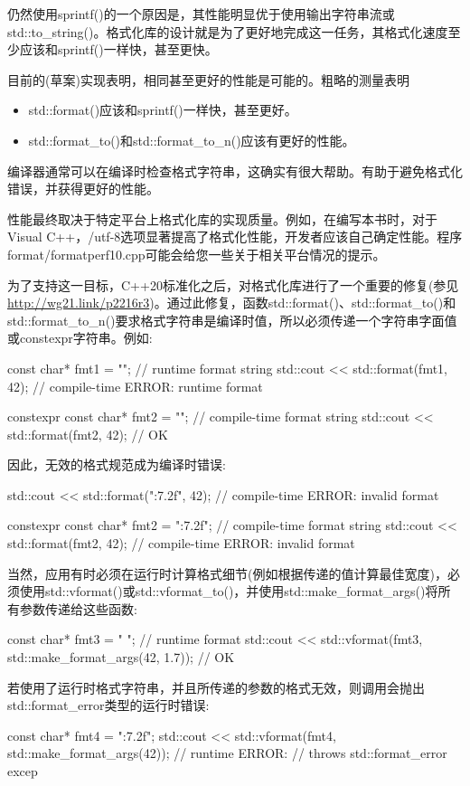 
仍然使用sprintf()的一个原因是，其性能明显优于使用输出字符串流或std::to\_string()。格式化库的设计就是为了更好地完成这一任务，其格式化速度至少应该和sprintf()一样快，甚至更快。

目前的(草案)实现表明，相同甚至更好的性能是可能的。粗略的测量表明

\begin{itemize}
\item
std::format()应该和sprintf()一样快，甚至更好。

\item
std::format\_to()和std::format\_to\_n()应该有更好的性能。
\end{itemize}

编译器通常可以在编译时检查格式字符串，这确实有很大帮助。有助于避免格式化错误，并获得更好的性能。

性能最终取决于特定平台上格式化库的实现质量。例如，在编写本书时，对于Visual C++，/utf-8选项显著提高了格式化性能，开发者应该自己确定性能。程序format/formatperf10.cpp可能会给您一些关于相关平台情况的提示。


为了支持这一目标，C++20标准化之后，对格式化库进行了一个重要的修复(参见\url{http://wg21.link/p2216r3})。通过此修复，函数std::format()、std::format\_to()和std::format\_to\_n()要求格式字符串是编译时值，所以必须传递一个字符串字面值或constexpr字符串。例如:

\begin{cpp}
const char* fmt1 = "{}\n"; // runtime format string
std::cout << std::format(fmt1, 42); // compile-time ERROR: runtime format

constexpr const char* fmt2 = "{}\n"; // compile-time format string
std::cout << std::format(fmt2, 42); // OK
\end{cpp}

因此，无效的格式规范成为编译时错误:

\begin{cpp}
std::cout << std::format("{:7.2f}\n", 42); // compile-time ERROR: invalid format

constexpr const char* fmt2 = "{:7.2f}\n"; // compile-time format string
std::cout << std::format(fmt2, 42); // compile-time ERROR: invalid format
\end{cpp}

当然，应用有时必须在运行时计算格式细节(例如根据传递的值计算最佳宽度)，必须使用std::vformat()或std::vformat\_to()，并使用std::make\_format\_args()将所有参数传递给这些函数:

\begin{cpp}
const char* fmt3 = "{} {}\n"; // runtime format
std::cout << std::vformat(fmt3, std::make_format_args(42, 1.7)); // OK
\end{cpp}

若使用了运行时格式字符串，并且所传递的参数的格式无效，则调用会抛出std::format\_error类型的运行时错误:

\begin{cpp}
const char* fmt4 = "{:7.2f}\n";
std::cout << std::vformat(fmt4, std::make_format_args(42)); // runtime ERROR:
// throws std::format_error excep
\end{cpp}


